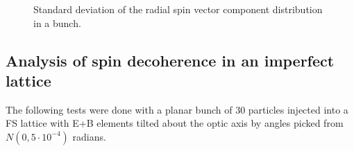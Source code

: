 \begin{figure}[h!]
	\centering
	\caption{Standard deviation of the radial spin vector component distribution in a bunch.\label{fig:decoh:SY_SD}}
\end{figure}

\subsection{Analysis of spin decoherence in an imperfect lattice}\label{sec:decoh:sim-imperfect}
The following tests were done with a planar bunch of 30 particles injected into a FS lattice
with E+B elements tilted about the optic axis by angles picked from $N(0, 5\cdot10^{-4})$ radians.


